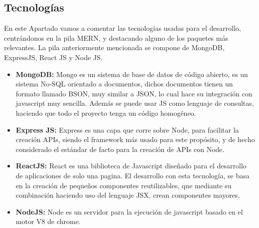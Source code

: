 \subsection {Tecnologías}
En este Apartado vamos a comentar las tecnologías usadas para el desarrollo, centrándonos en la pila MERN, y destacando alguno de los paquetes más relevantes. La pila anteriormente mencionada se compone de MongoDB, ExpressJS, React JS y Node JS.
\begin{itemize}
  \item \textbf{MongoDB:} Mongo es un sistema de base de datos de código abierto, es un sistema No-SQL orientado a documentos, dichos documentos tienen un formato llamado BSON, muy similar a JSON, lo cual hace su integración con javascript muy sencilla. Además se puede usar JS como lenguaje de consultas, haciendo que todo el proyecto tenga un código homogéneo.
  \item \textbf{Express JS:} Express es una capa que corre sobre Node, para facilitar la creación APIs, siendo el framework más usado para este propósito, y de hecho considerado el estándar de facto para la creación de APIs con Node.
  \item \textbf{ReactJS:} React es una biblioteca de Javascript diseñado para el desarrollo de aplicaciones de solo una pagina. El desarrollo con esta tecnología, se basa en la creación de pequeños componentes reutilizables, que mediante su combinación haciendo uso del lenguaje JSX, crean componentes mayores.
  \item \textbf{NodeJS:} Node es un servidor para la ejecución de javascript basado en el motor V8 de chrome. 
\end{itemize}

